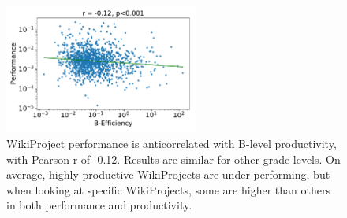 \begin{figure}[t!]
\centering
\includegraphics[width=2.5in,height=1.67in]{fig/WPProdPerf/fig-perf-eff.pdf}
\caption{
WikiProject performance is anticorrelated with B-level productivity,
with Pearson r of -0.12.
Results are similar for other grade levels.
On average, highly productive WikiProjects are under-performing,
but when looking at specific WikiProjects,
some are higher than others in both performance and productivity.
\label{fig:eff-perf}
}
\end{figure}


